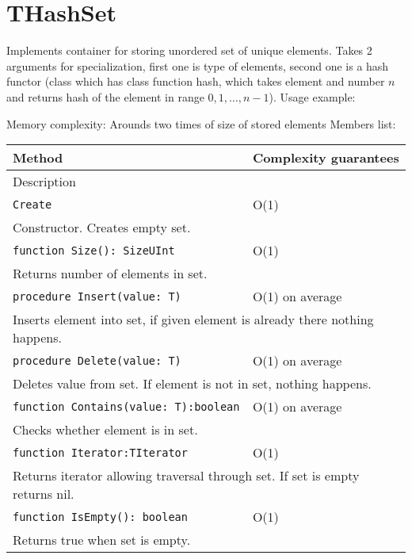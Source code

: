 \chapter{THashSet}

Implements container for storing unordered set of unique elements.
Takes 2 arguments for specialization, first one is type of elements, second one is a hash functor
(class which has class function hash, which takes element and number $n$ and returns hash of the
element in range $0, 1, \dots, n-1$). 
Usage example:



Memory complexity:
Arounds two times of size of stored elements 
Members list:

\begin{longtable}{|m{10cm}|m{5cm}|}
\hline
Method & Complexity guarantees \\ \hline
\multicolumn{2}{|m{15cm}|}{Description} \\ \hline\hline

\verb!Create! & O(1) \\ \hline
\multicolumn{2}{|m{15cm}|}{Constructor. Creates empty set.} \\ \hline\hline

\verb!function Size(): SizeUInt! & O(1) \\ \hline
\multicolumn{2}{|m{15cm}|}{Returns number of elements in set.} \\\hline\hline

\verb!procedure Insert(value: T)! &
O(1) on average \\ \hline
\multicolumn{2}{|m{15cm}|}{Inserts element into set, if given element is already there nothing
happens.} \\\hline\hline

\verb!procedure Delete(value: T)! &
O(1) on average \\ \hline
\multicolumn{2}{|m{15cm}|}{Deletes value from set. If element is not in set, nothing happens.} \\\hline\hline

\verb!function Contains(value: T):boolean! & O(1) on average \\\hline
\multicolumn{2}{|m{15cm}|}{Checks whether element is in set.} \\\hline\hline

\verb!function Iterator:TIterator! & O(1) \\\hline
\multicolumn{2}{|m{15cm}|}{Returns iterator allowing traversal through set. If set is empty returns nil.} \\\hline\hline

\verb!function IsEmpty(): boolean! & O(1) \\ \hline
\multicolumn{2}{|m{15cm}|}{Returns true when set is empty.} \\\hline

\end{longtable}

